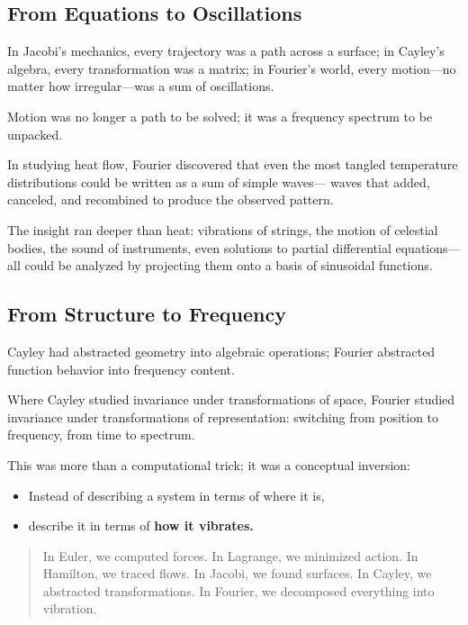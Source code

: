 \subsection{From Equations to Oscillations}

In Jacobi’s mechanics, every trajectory was a path across a surface;  
in Cayley’s algebra, every transformation was a matrix;  
in Fourier’s world, every motion—no matter how irregular—was a sum of oscillations.

Motion was no longer a path to be solved;  
it was a frequency spectrum to be unpacked.

In studying heat flow, Fourier discovered that even the most tangled temperature distributions could be written as a sum of simple waves—  
waves that added, canceled, and recombined to produce the observed pattern.

The insight ran deeper than heat:  
vibrations of strings, the motion of celestial bodies, the sound of instruments, even solutions to partial differential equations—  
all could be analyzed by projecting them onto a basis of sinusoidal functions.

\subsection{From Structure to Frequency}

Cayley had abstracted geometry into algebraic operations;  
Fourier abstracted function behavior into frequency content.

Where Cayley studied invariance under transformations of space,  
Fourier studied invariance under transformations of representation:  
switching from position to frequency, from time to spectrum.

This was more than a computational trick; it was a conceptual inversion:

\begin{itemize}
  \item Instead of describing a system in terms of where it is,  
  \item describe it in terms of \textbf{how it vibrates.}
\end{itemize}


\begin{quote}
In Euler, we computed forces.  
In Lagrange, we minimized action.  
In Hamilton, we traced flows.  
In Jacobi, we found surfaces.  
In Cayley, we abstracted transformations.  
In Fourier, we decomposed everything into vibration.
\end{quote}

